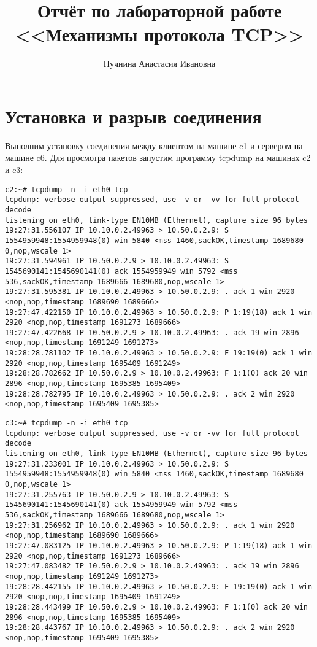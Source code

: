 \documentclass[a4paper,12pt]{article}
\title{Отчёт по лабораторной работе \\ <<Механизмы протокола TCP>>}
\author{Пучнина Анастасия Ивановна}
\begin{document}
\maketitle

\tableofcontents

\section{Установка и разрыв соединения}

Выполним установку соединения между клиентом на машине c1 и сервером на машине c6.
Для просмотра пакетов запустим программу tcpdump на машинах c2 и c3:

\begin{Verbatim}
c2:~# tcpdump -n -i eth0 tcp
tcpdump: verbose output suppressed, use -v or -vv for full protocol decode
listening on eth0, link-type EN10MB (Ethernet), capture size 96 bytes
19:27:31.556107 IP 10.10.0.2.49963 > 10.50.0.2.9: S 1554959948:1554959948(0) win 5840 <mss 1460,sackOK,timestamp 1689680 0,nop,wscale 1>
19:27:31.594961 IP 10.50.0.2.9 > 10.10.0.2.49963: S 1545690141:1545690141(0) ack 1554959949 win 5792 <mss 536,sackOK,timestamp 1689666 1689680,nop,wscale 1>
19:27:31.595381 IP 10.10.0.2.49963 > 10.50.0.2.9: . ack 1 win 2920 <nop,nop,timestamp 1689690 1689666>
19:27:47.422150 IP 10.10.0.2.49963 > 10.50.0.2.9: P 1:19(18) ack 1 win 2920 <nop,nop,timestamp 1691273 1689666>
19:27:47.422668 IP 10.50.0.2.9 > 10.10.0.2.49963: . ack 19 win 2896 <nop,nop,timestamp 1691249 1691273>
19:28:28.781102 IP 10.10.0.2.49963 > 10.50.0.2.9: F 19:19(0) ack 1 win 2920 <nop,nop,timestamp 1695409 1691249>
19:28:28.782662 IP 10.50.0.2.9 > 10.10.0.2.49963: F 1:1(0) ack 20 win 2896 <nop,nop,timestamp 1695385 1695409>
19:28:28.782795 IP 10.10.0.2.49963 > 10.50.0.2.9: . ack 2 win 2920 <nop,nop,timestamp 1695409 1695385>
\end{Verbatim}


\begin{Verbatim}
c3:~# tcpdump -n -i eth0 tcp
tcpdump: verbose output suppressed, use -v or -vv for full protocol decode
listening on eth0, link-type EN10MB (Ethernet), capture size 96 bytes
19:27:31.233001 IP 10.10.0.2.49963 > 10.50.0.2.9: S 1554959948:1554959948(0) win 5840 <mss 1460,sackOK,timestamp 1689680 0,nop,wscale 1>
19:27:31.255763 IP 10.50.0.2.9 > 10.10.0.2.49963: S 1545690141:1545690141(0) ack 1554959949 win 5792 <mss 536,sackOK,timestamp 1689666 1689680,nop,wscale 1>
19:27:31.256962 IP 10.10.0.2.49963 > 10.50.0.2.9: . ack 1 win 2920 <nop,nop,timestamp 1689690 1689666>
19:27:47.083125 IP 10.10.0.2.49963 > 10.50.0.2.9: P 1:19(18) ack 1 win 2920 <nop,nop,timestamp 1691273 1689666>
19:27:47.083482 IP 10.50.0.2.9 > 10.10.0.2.49963: . ack 19 win 2896 <nop,nop,timestamp 1691249 1691273>
19:28:28.442155 IP 10.10.0.2.49963 > 10.50.0.2.9: F 19:19(0) ack 1 win 2920 <nop,nop,timestamp 1695409 1691249>
19:28:28.443499 IP 10.50.0.2.9 > 10.10.0.2.49963: F 1:1(0) ack 20 win 2896 <nop,nop,timestamp 1695385 1695409>
19:28:28.443767 IP 10.10.0.2.49963 > 10.50.0.2.9: . ack 2 win 2920 <nop,nop,timestamp 1695409 1695385>
\end{Verbatim}
\end{document}
